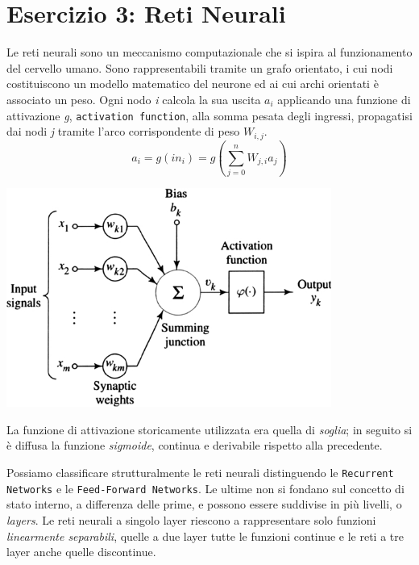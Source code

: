 		\section{Esercizio 3: Reti Neurali}
			\label{sec: es3}
			Le reti neurali sono un meccanismo computazionale che si ispira al funzionamento del cervello umano. Sono rappresentabili tramite un grafo orientato, i cui nodi costituiscono un modello matematico del neurone ed ai cui archi orientati è associato un peso. Ogni nodo \textit{i} calcola la sua uscita $a_{i}$ applicando una funzione di attivazione \textit{g}, \texttt{activation function}, alla somma pesata degli ingressi, propagatisi dai nodi \textit{j} tramite l'arco corrispondente di peso $W_{i,j}$.
			\begin{equation}
			a_{i} = g(in_{i}) =g( \sum_{j=0}^n W_{j,i} a_{j})
			\end{equation}
			\medskip
			\begin{center}
				\includegraphics[width=0.8\textwidth, height=0.3\textheight]{neurone.jpg}
			\end{center}
			La funzione di attivazione storicamente utilizzata era quella di \emph{soglia}; in seguito si è diffusa la funzione \emph{sigmoide}, continua e derivabile rispetto alla precedente.\par
			Possiamo classificare strutturalmente le reti neurali distinguendo le \texttt{Recurrent Networks} e le \texttt{Feed-Forward Networks}. Le ultime non si fondano sul concetto di stato interno, a differenza delle prime, e possono essere suddivise in più livelli, o \emph{layers}. Le reti neurali a singolo layer riescono a rappresentare solo funzioni \emph{linearmente separabili}, quelle a due layer tutte le funzioni continue e le reti a tre layer anche quelle discontinue.
